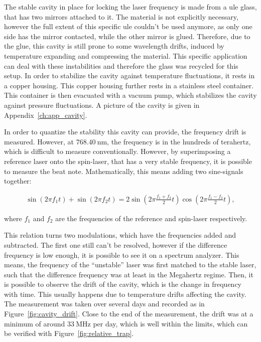 The stable cavity in place for locking the laser frequency is made from a \ac{ule} glass, that has two mirrors attached to it. The material is not explicitly necessary, however the full extent of this specific \ac{ule} couldn't be used anymore, as only one side has the mirror contacted, while the other mirror is glued. Therefore, due to the glue, this cavity is still prone to some wavelength drifts, induced by temperature expanding and compressing the material. This specific application can deal with these instabilities and therefore the glass was recycled for this setup. In order to stabilize the cavity against temperature fluctuations, it rests in a copper housing. This copper housing further rests in a stainless steel container. This container is then evacuated with a vacuum pump, which stabilizes the cavity against pressure fluctuations. A picture of the cavity is given in Appendix~\ref{ch:app_cavity}.

In order to quantize the stability this cavity can provide, the frequency drift is measured. However, at $\SI{768.40}{\nano\meter}$, the frequency is in the hundreds of terahertz, which is difficult to measure conventionally. However, by superimposing a reference laser onto the spin-laser, that has a very stable frequency, it is possible to measure the beat note. Mathematically, this means adding two sine-signals together:

\begin{align}
	\sin{\left(2\pi f_1 t\right)} + \sin{\left( 2 \pi f_2 t \right)}
	= 2 \sin{\left( 2\pi \frac{f_1+f_2}{2}t \right)} \cos{\left( 2\pi \frac{f_1-f_2}{2}t \right)},
\end{align}

where $f_1$ and $f_2$ are the frequencies of the reference and spin-laser respectively.

This relation turns two modulations, which have the frequencies added and subtracted. The first one still can't be resolved, however if the difference frequency is low enough, it is possible to see it on a spectrum analyzer. This means, the frequency of the ``unstable'' laser was first matched to the stable laser, such that the difference frequency was at least in the Megahertz regime. Then, it is possible to observe the drift of the cavity, which is the change in frequency with time. This usually happens due to temperature drifts affecting the cavity. The measurement was taken over several days and recorded as in Figure~\ref{fig:cavity_drift}. Close to the end of the measurement, the drift was at a minimum of around $\SI{33}{\mega\hertz}$ per day, which is well within the limits, which can be verified with Figure~\ref{fig:relative_trap}.

